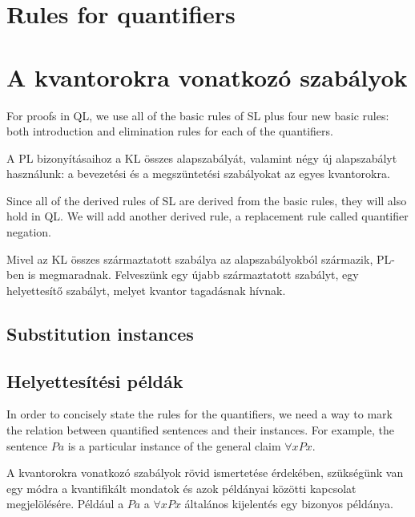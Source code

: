 


\section*{Rules for quantifiers}

\section{A kvantorokra vonatkozó szabályok}

For proofs in QL, we use all of the basic rules of SL plus four new basic rules: both introduction and elimination rules for each of the quantifiers.

A PL bizonyításaihoz a KL összes alapszabályát, valamint négy új alapszabályt használunk: a bevezetési és a megszüntetési szabályokat az egyes kvantorokra.

Since all of the derived rules of SL are derived from the basic rules, they will also hold in QL. We will add another derived rule, a replacement rule called quantifier negation.

Mivel az KL összes származtatott szabálya az alapszabályokból származik, PL-ben is megmaradnak. Felveszünk egy újabb származtatott szabályt, egy helyettesítő szabályt, melyet kvantor tagadásnak hívnak.

\subsection{Substitution instances}

\subsection{Helyettesítési példák}

In order to concisely state the rules for the quantifiers, we need a way to mark the relation between quantified sentences and their instances. For example, the sentence $Pa$ is a particular instance of the general claim $\forall x Px$.

A kvantorokra vonatkozó szabályok rövid ismertetése érdekében, szükségünk van egy módra a kvantifikált mondatok és azok példányai közötti kapcsolat megjelölésére. Például a $Pa$ a $\forall x Px$ általános kijelentés egy bizonyos példánya.

